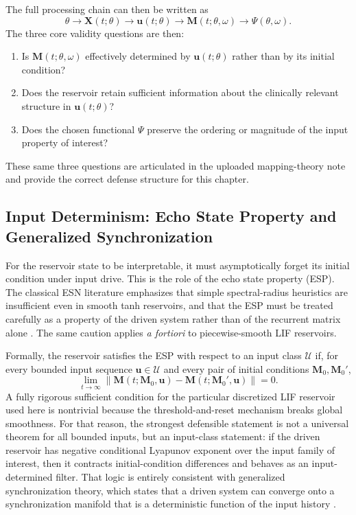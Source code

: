 The full processing chain can then be written as
\begin{equation}
\theta \rightarrow \mathbf{X}(t;\theta) \rightarrow \mathbf{u}(t;\theta) \rightarrow \mathbf{M}(t;\theta,\omega) \rightarrow \Psi(\theta,\omega).
\end{equation}
The three core validity questions are then:
\begin{enumerate}
    \item Is $\mathbf{M}(t;\theta,\omega)$ effectively determined by $\mathbf{u}(t;\theta)$ rather than by its initial condition?
    \item Does the reservoir retain sufficient information about the clinically relevant structure in $\mathbf{u}(t;\theta)$?
    \item Does the chosen functional $\Psi$ preserve the ordering or magnitude of the input property of interest?
\end{enumerate}
These same three questions are articulated in the uploaded mapping-theory note and provide the correct defense structure for this chapter.

\subsection{Input Determinism: Echo State Property and Generalized Synchronization}

For the reservoir state to be interpretable, it must asymptotically forget its initial condition under input drive. This is the role of the echo state property (ESP). The classical ESN literature emphasizes that simple spectral-radius heuristics are insufficient even in smooth tanh reservoirs, and that the ESP must be treated carefully as a property of the driven system rather than of the recurrent matrix alone \cite{yildiz_re-visiting_2012}. The same caution applies \emph{a fortiori} to piecewise-smooth LIF reservoirs.

Formally, the reservoir satisfies the ESP with respect to an input class $\mathcal{U}$ if, for every bounded input sequence $\mathbf{u}\in\mathcal{U}$ and every pair of initial conditions $\mathbf{M}_0,\mathbf{M}_0'$,
\begin{equation}
\lim_{t\rightarrow\infty}\left\|\mathbf{M}(t;\mathbf{M}_0,\mathbf{u})-\mathbf{M}(t;\mathbf{M}_0',\mathbf{u})\right\|=0.
\end{equation}
A fully rigorous sufficient condition for the particular discretized LIF reservoir used here is nontrivial because the threshold-and-reset mechanism breaks global smoothness. For that reason, the strongest defensible statement is not a universal theorem for all bounded inputs, but an input-class statement: if the driven reservoir has negative conditional Lyapunov exponent over the input family of interest, then it contracts initial-condition differences and behaves as an input-determined filter. That logic is entirely consistent with generalized synchronization theory, which states that a driven system can converge onto a synchronization manifold that is a deterministic function of the input history \cite{rulkov_generalized_1995,yildiz_re-visiting_2012}.

